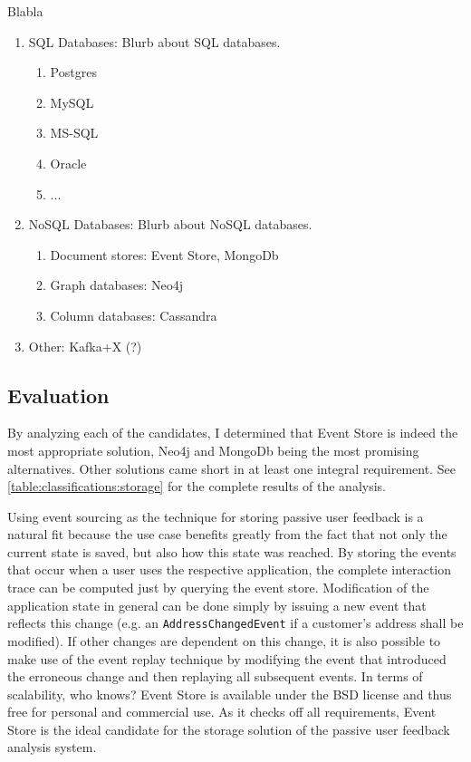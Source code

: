 Blabla

\begin{enumerate}
\item \ac{SQL} Databases: Blurb about SQL databases.
\begin{enumerate}
\item Postgres
\item MySQL
\item MS-SQL
\item Oracle
\item ...
\end{enumerate}
\item NoSQL Databases: Blurb about NoSQL databases.\cite{strauch2011nosql}
\begin{enumerate}
\item Document stores: Event Store, MongoDb
\item Graph databases: Neo4j
\item Column databases: Cassandra
\end{enumerate}
\item Other: Kafka+X (?)
\end{enumerate}

\subsection{Evaluation}

By analyzing each of the candidates, I determined that Event Store is indeed the most appropriate solution, Neo4j and MongoDb being the most promising alternatives.
Other solutions came short in at least one integral requirement.
See \cref{table:classifications:storage} for the complete results of the analysis.

Using event sourcing as the technique for storing passive user feedback is a natural fit because the use case benefits greatly from the fact that not only the current state is saved, but also how this state was reached.
By storing the events that occur when a user uses the respective application, the complete interaction trace can be computed just by querying the event store.
Modification of the application state in general can be done simply by issuing a new event that reflects this change (e.g. an \texttt{AddressChangedEvent} if a customer's address shall be modified).
If other changes are dependent on this change, it is also possible to make use of the event replay technique by modifying the event that introduced the erroneous change and then replaying all subsequent events.
In terms of scalability, who knows? 
Event Store is available under the BSD license and thus free for personal and commercial use.
As it checks off all requirements, Event Store is the ideal candidate for the storage solution of the passive user feedback analysis system.

